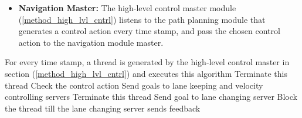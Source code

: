 \begin{itemize}
\begin{algorithm}[H]
                \caption{Lane Changing Server Algorithm}
            \end{algorithm}      
            \begin{itemize}
            \item \textbf{Navigation Master:}
            The high-level control master module (\ref{method_high_lvl_cntrl}) listens to the path planning module that generates a control action every time stamp, and pass the chosen control action to the navigation module master.
            \end{itemize}
            \begin{algorithm}[H]
                \SetAlgoLined
                For every time stamp, a thread is generated by the high-level control master in section (\ref{method_high_lvl_cntrl}) \cite{ROSBookMorgan} and executes this algorithm\;
                  {Terminate this thread\;}
                  {
                  Check the control action\;
                    {
                    Send goals to lane keeping and velocity controlling servers\; 
                    Terminate this thread\;
                    }
                    {
                    Send goal to lane changing server\;
                    Block the thread till the lane changing server sends feedback\;
                    {
}}}
\end{algorithm}
\end{itemize}
